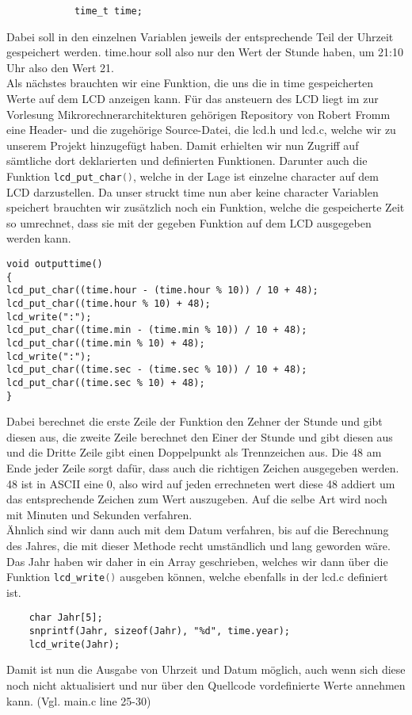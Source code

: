 \documentclass[openright,twoside,12pt,a4paper]{scrartcl}
\begin{document}
\begin{flushleft}
\begin{lstlisting}
			time_t time;
		\end{lstlisting}
		Dabei soll in den einzelnen Variablen jeweils der entsprechende Teil der Uhrzeit gespeichert werden. time.hour soll also nur den Wert der Stunde haben, um 21:10 Uhr also den Wert 21.\\
		Als nächstes brauchten wir eine Funktion, die uns die in time gespeicherten Werte auf dem LCD anzeigen kann. Für das ansteuern des LCD liegt im zur Vorlesung Mikrorechnerarchitekturen gehörigen Repository von Robert Fromm eine Header- und die zugehörige Source-Datei, die lcd.h und lcd.c, welche wir zu unserem Projekt hinzugefügt haben. Damit erhielten wir nun Zugriff auf sämtliche dort deklarierten und definierten Funktionen. Darunter auch die Funktion \lstinline[language=C++]|lcd_put_char()|, welche in der Lage ist einzelne  character auf dem LCD darzustellen. Da unser struckt time nun aber keine character Variablen speichert brauchten wir zusätzlich noch ein Funktion, welche die gespeicherte Zeit so umrechnet, dass sie mit der gegeben Funktion auf dem LCD ausgegeben werden kann. 
		\begin{lstlisting}
void outputtime()
{
lcd_put_char((time.hour - (time.hour % 10)) / 10 + 48);
lcd_put_char((time.hour % 10) + 48);
lcd_write(":");
lcd_put_char((time.min - (time.min % 10)) / 10 + 48);
lcd_put_char((time.min % 10) + 48);
lcd_write(":");
lcd_put_char((time.sec - (time.sec % 10)) / 10 + 48);
lcd_put_char((time.sec % 10) + 48);
}
		\end{lstlisting}
		Dabei berechnet die erste Zeile der Funktion den Zehner der Stunde und gibt diesen aus, die zweite Zeile berechnet den Einer der Stunde und gibt diesen aus und die Dritte Zeile gibt einen Doppelpunkt als Trennzeichen aus. Die 48 am Ende jeder Zeile sorgt dafür, dass auch die richtigen Zeichen ausgegeben werden. 48 ist in ASCII eine 0, also wird auf jeden errechneten wert diese 48 addiert um das entsprechende Zeichen zum Wert auszugeben. Auf die selbe Art wird noch mit Minuten und Sekunden verfahren.\\
		Ähnlich sind wir dann auch mit dem Datum verfahren, bis auf die Berechnung des Jahres, die mit dieser Methode recht umständlich und lang geworden wäre. Das Jahr haben wir daher in ein Array geschrieben, welches wir dann über die Funktion \lstinline[language=c++]|lcd_write()| ausgeben können, welche ebenfalls in der lcd.c definiert ist. \\
		\begin{lstlisting}
 	char Jahr[5];
	snprintf(Jahr, sizeof(Jahr), "%d", time.year);
	lcd_write(Jahr);
		\end{lstlisting}
		Damit ist nun die Ausgabe von Uhrzeit und Datum möglich, auch wenn sich diese noch nicht aktualisiert und nur über den Quellcode vordefinierte Werte annehmen kann. (Vgl. main.c line 25-30)
		\newpage

\end{flushleft}
\end{document}

